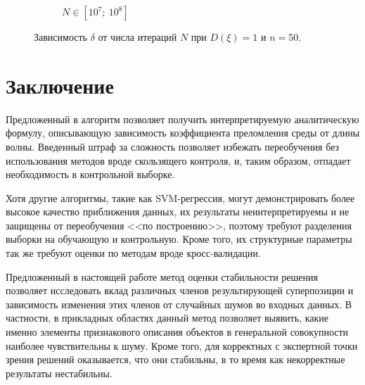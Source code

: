 \documentclass[11pt,a4paper]{article}
\theoremstyle{definition}
\begin{document}
\begin{figure}[h!]
\begin{subfigure}[b]{0.3\textwidth}
    \caption{$N \in [10^7;~10^8]$}
    \label{fig:classic_var1_n50_end}
  \end{subfigure}
  \caption{Зависимость $\delta$ от числа итераций $N$ при $D(\xi) = 1$ и $n = 50$.}
  \label{fig:classic_var1_n50}
\end{figure}

\section{Заключение}

Предложенный в \cite{Rudoy13} алгоритм позволяет получить интерпретируемую аналитическую
формулу, описывающую зависимость коэффициента преломления среды от длины волны.
Введенный штраф за сложность позволяет избежать переобучения без использования методов
вроде скользящего контроля, и, таким образом, отпадает необходимость в контрольной выборке.

Хотя другие алгоритмы, такие как SVM-регрессия, могут демонстрировать более высокое
качество приближения данных, их результаты неинтерпретируемы и не защищены от переобучения
<<по построению>>, поэтому требуют разделения выборки на обучающую и контрольную. Кроме
того, их структурные параметры так же требуют оценки по методам вроде кросс-валидации.

Предложенный в настоящей работе метод оценки стабильности решения позволяет исследовать вклад различных
членов результирующей суперпозиции и зависимость изменения этих членов от
случайных шумов во входных данных. В частности, в прикладных областях данный метод позволяет
выявить, какие именно элементы признакового описания объектов в генеральной совокупности
наиболее чувствительны к шуму. Кроме того, для корректных с экспертной точки зрения
решений оказывается, что они стабильны, в то время как некорректные результаты нестабильны.

\FloatBarrier


%
%

\end{document}
